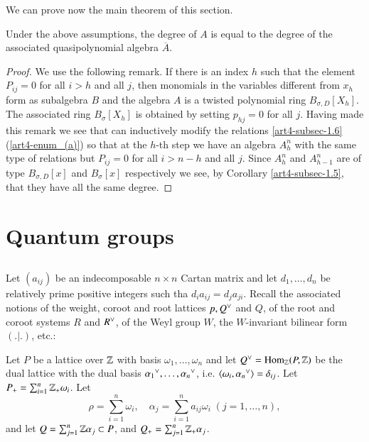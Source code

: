 We can prove now the main theorem of this section.

\begin{theorem*}
Under the above assumptions, the degree of $A$ is equal to the degree of the associated quasipolynomial algebra $\overline{A}$. 
\end{theorem*}

\begin{proof}
We use the following remark. If there is an index $h$ such that the element $P_{ij} =0$ for all $i> h$ and all $j$, then monomials in the variables different from $x_{h}$ form as subalgebra $B$ and the algebra $A$ is a twisted polynomial ring $B_{\sigma, D}[X_{h}]$. The associated ring $B_{\sigma}[X_{h}]$ is obtained by setting $p_{hj} = 0$ for all $j$. Having made this remark we see that can inductively modify the relations \ref{art4-subsec-1.6}(\ref{art4-enum_(a)}) so that at the $h$-th step we have an algebra $A_{h}^{n}$ with the same type of relations but $P_{ij} = 0$ for all $i>n-h$ and all $j$. Since $A_{h}^{n}$ and $A_{h-1}^{n}$ are of type $B_{\sigma, D}[x]$ and $B_{\sigma}[x]$ respectively we see, by Corollary \ref{art4-subsec-1.5}, that they have all the same degree. 
\end{proof}

\section{Quantum groups}

\subsection{}\label{art4-subsec-2.1}
Let $(a_{ij})$ be an indecomposable $n\times n $ Cartan matrix and let $d_{1}, \ldots, d_{n}$ be relatively prime positive integers such tha $d_{i}a_{ij} = d_{j}a_{ji}$. Recall the associated notions of the weight, coroot and root lattices $p,Q\spcheck$ and $Q$, of the root and coroot systems $R$ and $R\spcheck$, of the Weyl group $W$, the $W$-invariant bilinear form $(.|.)$, etc.:  

Let $P$ be a lattice over $\mathbb{Z}$ with basis $\omega_{1},\ldots, \omega_{n}$ and let $Q\spcheck = \Hom_{\bbZ}(P, \bbZ)$ be the dual lattice with the dual basis $\alpha_{1}{\spcheck}, \ldots, \alpha_{n}{\spcheck}$, i.e. $\langle \omega_{i}, \alpha_{n}{\spcheck}\rangle = \delta_{ij}$. Let $P_{+}= \sum_{i=1}^{n} \mathbb{Z}_{+}\omega_{i}$. Let 
 $$
 \rho = \sum\limits_{i=1}^{n} \omega_{i},\quad \alpha_{j} = \sum\limits_{i=1}^{n}a_{ij}\omega_{i}\;(j=1,\ldots, n),
$$
and let $Q=\sum_{j=1}^{n}\mathbb{Z}\alpha_{j} \subset P$, and $Q_{+} = \sum_{j=1}^{n}\mathbb{Z}_{+}\alpha_{j}$.


